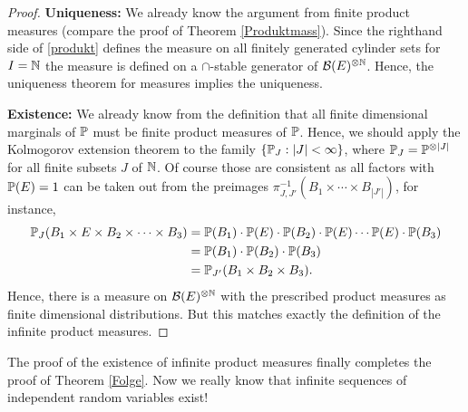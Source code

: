 \begin{proof}[Proof]
	\textbf{Uniqueness:} We already know the argument from finite product measures (compare the proof of Theorem \ref{Produktmass}). Since the righthand side of  \eqref{produkt} defines the measure on all finitely generated cylinder sets for $I=\N$ the measure is defined on a $\cap$-stable generator of $\mathcal B(E)^{\otimes \N}$. Hence, the uniqueness theorem for measures implies the uniqueness.\smallskip

	\textbf{Existence:} We already know from the definition that all finite dimensional marginals of $\P$ must be finite product measures of $\P$. Hence, we should apply the Kolmogorov extension theorem to the family $\{\P_J:|J|<\infty\}$, where $\P_J=\P^{\otimes |J|}$ for all finite subsets $J$ of $\N$. Of course those are consistent as all factors with $\P(E)=1$ can be taken out from the preimages $\pi^{-1}_{J,J'}(B_1\times \cdots \times B_{|J'|})$, for instance, 
	\begin{align*}
		\P_J(B_1\times E\times B_2\times \cdots \times B_3)&=\P(B_1)\cdot\P(E)\cdot \P(B_2)\cdot \P(E)\cdots \P(E)\cdot\P(B_3)\\
		&=\P(B_1)\cdot \P(B_2)\cdot \P(B_3)\\
		&=\P_{J'}(B_1\times B_2\times B_3).
	\end{align*}	
	Hence, there is a measure on $\mathcal B(E)^{\otimes \N}$ with the prescribed product measures as finite dimensional distributions. But this matches exactly the definition of the infinite product measures.
\end{proof}
The proof of the existence of infinite product measures finally completes the proof of Theorem \ref{Folge}. Now we really know that infinite sequences of independent random variables exist!

\marginpar{\textcolor{red}{Lecture 20}}

